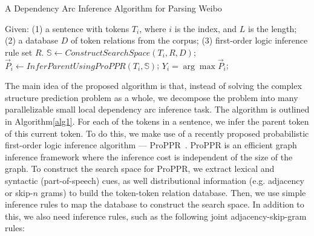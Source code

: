\documentclass[11pt,letterpaper]{article}
\begin{document}
\begin{algorithm}[t] 
\small{
\caption{A Dependency Arc Inference Algorithm for Parsing Weibo} \label{alg1}
\begin{algorithmic}
\STATE Given: 
\STATE (1) a sentence with tokens $T_{i}$, where $i$ is the index, and $L$ is the length;
\STATE (2) a database $D$ of token relations from the corpus;
\STATE (3) first-order logic inference rule set $R$.
\STATE
{}
\STATE $\mathbb{S} \leftarrow ConstructSearchSpace(T_{i},R,D)$;
\STATE $\vec P_i \leftarrow InferParentUsingProPPR(T_{i},\mathbb{S})$;
\ENDFOR
{}
\STATE $Y_i = \arg\max \vec P_i$;
\ENDFOR
\end{algorithmic}}
\end{algorithm}

The main idea of the proposed algorithm
is that, instead of solving
the complex structure prediction problem as a whole,
we decompose the problem
into many parallelizable small local dependency arc inference task.
The algorithm is outlined in Algorithm\ref{alg1}.
For each of the tokens in a sentence,
we infer the parent token of this current token.
To do this, we make use of a recently proposed 
probabilistic first-order logic inference algorithm --- ProPPR~\citep{wangprogramming2013}.
ProPPR is an efficient graph inference framework
where the inference cost is independent of the size of the graph.
To construct the search space for ProPPR, 
we extract lexical and syntactic (part-of-speech) cues,
as well distributional information (e.g. adjacency or skip-$n$ grams)
to build the token-token relation database.
Then, we use simple inference rules to map 
the database to construct the search space.
In addition to this, we also need inference rules,
such as the following joint adjacency-skip-gram rules:
\end{document}
